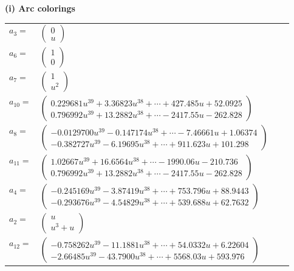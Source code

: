 \documentclass[1p]{elsarticle_modified}
\theoremstyle{definition}
\begin{document}
\flushleft \textbf{(i) Arc colorings}\\
\begin{tabular}{m{7pt} m{180pt} m{7pt} m{180pt} }
\flushright $a_{3}=$&$\begin{pmatrix}0\\u\end{pmatrix}$ \\
\flushright $a_{6}=$&$\begin{pmatrix}1\\0\end{pmatrix}$ \\
\flushright $a_{7}=$&$\begin{pmatrix}1\\u^2\end{pmatrix}$ \\
\flushright $a_{10}=$&$\begin{pmatrix}0.229681 u^{39}+3.36823 u^{38}+\cdots+427.485 u+52.0925\\0.796992 u^{39}+13.2882 u^{38}+\cdots-2417.55 u-262.828\end{pmatrix}$ \\
\flushright $a_{8}=$&$\begin{pmatrix}-0.0129700 u^{39}-0.147174 u^{38}+\cdots-7.46661 u+1.06374\\-0.382727 u^{39}-6.19695 u^{38}+\cdots+911.623 u+101.298\end{pmatrix}$ \\
\flushright $a_{11}=$&$\begin{pmatrix}1.02667 u^{39}+16.6564 u^{38}+\cdots-1990.06 u-210.736\\0.796992 u^{39}+13.2882 u^{38}+\cdots-2417.55 u-262.828\end{pmatrix}$ \\
\flushright $a_{4}=$&$\begin{pmatrix}-0.245169 u^{39}-3.87419 u^{38}+\cdots+753.796 u+88.9443\\-0.293676 u^{39}-4.54829 u^{38}+\cdots+539.688 u+62.7632\end{pmatrix}$ \\
\flushright $a_{2}=$&$\begin{pmatrix}u\\u^3+u\end{pmatrix}$ \\
\flushright $a_{12}=$&$\begin{pmatrix}-0.758262 u^{39}-11.1881 u^{38}+\cdots+54.0332 u+6.22604\\-2.66485 u^{39}-43.7900 u^{38}+\cdots+5568.03 u+593.976\end{pmatrix}$ \\

\end{tabular}
\end{document}
